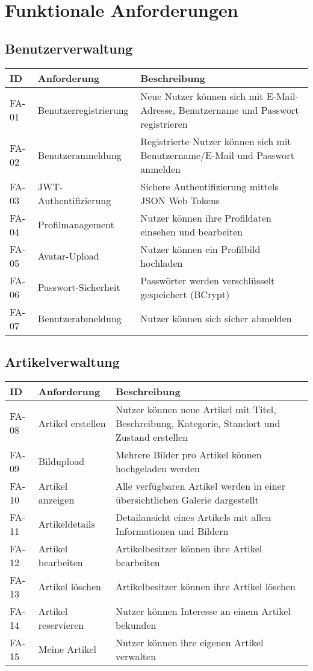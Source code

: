 \documentclass[a4paper,12pt]{article}
\begin{document}
\section{Funktionale Anforderungen}

\subsection{Benutzerverwaltung}
\begin{longtable}{|p{}|p{}|p{}|}
\hline
\textbf{ID} & \textbf{Anforderung} & \textbf{Beschreibung} \\
\hline
FA-01 & Benutzerregistrierung & Neue Nutzer können sich mit E-Mail-Adresse, Benutzername und Passwort registrieren \\
\hline
FA-02 & Benutzeranmeldung & Registrierte Nutzer können sich mit Benutzername/E-Mail und Passwort anmelden \\
\hline
FA-03 & JWT-Authentifizierung & Sichere Authentifizierung mittels JSON Web Tokens \\
\hline
FA-04 & Profilmanagement & Nutzer können ihre Profildaten einsehen und bearbeiten \\
\hline
FA-05 & Avatar-Upload & Nutzer können ein Profilbild hochladen \\
\hline
FA-06 & Passwort-Sicherheit & Passwörter werden verschlüsselt gespeichert (BCrypt) \\
\hline
FA-07 & Benutzerabmeldung & Nutzer können sich sicher abmelden \\
\hline
\end{longtable}

\subsection{Artikelverwaltung}
\begin{longtable}{|p{}|p{}|p{}|}
\hline
\textbf{ID} & \textbf{Anforderung} & \textbf{Beschreibung} \\
\hline
FA-08 & Artikel erstellen & Nutzer können neue Artikel mit Titel, Beschreibung, Kategorie, Standort und Zustand erstellen \\
\hline
FA-09 & Bildupload & Mehrere Bilder pro Artikel können hochgeladen werden \\
\hline
FA-10 & Artikel anzeigen & Alle verfügbaren Artikel werden in einer übersichtlichen Galerie dargestellt \\
\hline
FA-11 & Artikeldetails & Detailansicht eines Artikels mit allen Informationen und Bildern \\
\hline
FA-12 & Artikel bearbeiten & Artikelbesitzer können ihre Artikel bearbeiten \\
\hline
FA-13 & Artikel löschen & Artikelbesitzer können ihre Artikel löschen \\
\hline
FA-14 & Artikel reservieren & Nutzer können Interesse an einem Artikel bekunden \\
\hline
FA-15 & Meine Artikel & Nutzer können ihre eigenen Artikel verwalten \\
\hline
\end{longtable}
\end{document}
